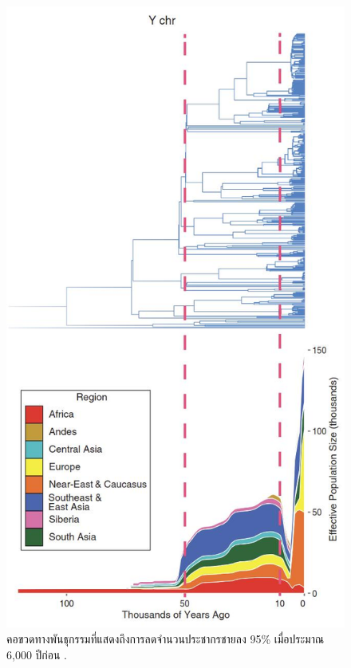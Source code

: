 \documentclass[10pt,twocolumn,letterpaper]{article}
\begin{document}
\begin{figure}[t]
\begin{center}
   \includegraphics[width=1\linewidth]{bottleneck.jpg}
\end{center}
   \caption{คอขวดทางพันธุกรรมที่แสดงถึงการลดจำนวนประชากรชายลง 95\% เมื่อประมาณ 6,000 ปีก่อน \cite{62}.}
\label{fig:10}
\label{fig:onecol}
\end{figure}
\end{document}
